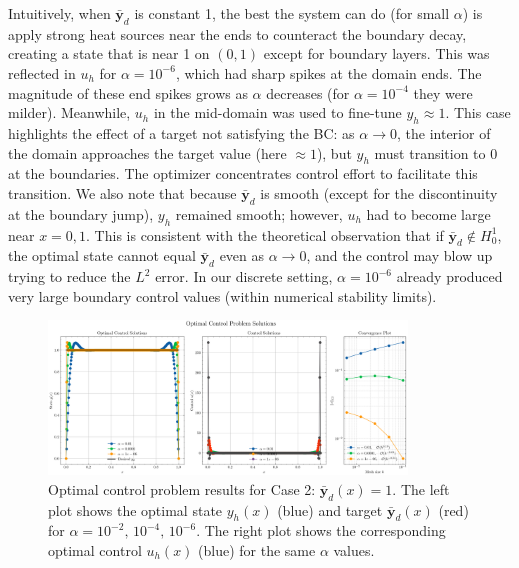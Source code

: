 Intuitively, when $\bar{\mathbf{y}}_d$ is constant 1, the best the system can do (for small $\alpha$) is apply strong heat sources near the ends to counteract the boundary decay, creating a state that is near 1 on $(0,1)$ except for boundary layers.
This was reflected in $u_h$ for $\alpha=10^{-6}$, which had sharp spikes at the domain ends. The magnitude of these end spikes grows as $\alpha$ decreases (for $\alpha=10^{-4}$ they were milder).
Meanwhile, $u_h$ in the mid-domain was used to fine-tune $y_h\approx 1$. This case highlights the effect of a target not satisfying the BC: as $\alpha\to0$, the interior of the domain approaches the target value (here $\approx 1$), but $y_h$ must transition to 0 at the boundaries. The optimizer concentrates control effort to facilitate this transition. We also note that because $\bar{\mathbf{y}}_d$ is smooth (except for the discontinuity at the boundary jump), $y_h$ remained smooth; however, $u_h$ had to become large near $x=0,1$. This is consistent with the theoretical observation that if $\bar{\mathbf{y}}_d\notin H^1_0$, the optimal state cannot equal $\bar{\mathbf{y}}_d$ even as $\alpha\to0$, and the control may blow up trying to reduce the $L^2$ error. In our discrete setting, $\alpha=10^{-6}$ already produced very large boundary control values (within numerical stability limits).
\begin{figure}[H]
	\centering
	\includegraphics[width=0.85\textwidth]{figures/opt_control_plot_Case 2.png}
	\caption{Optimal control problem results for Case 2: $\bar{\mathbf{y}}_d(x)=1$. The left plot shows the optimal state $y_h(x)$ (blue) and target $\bar{\mathbf{y}}_d(x)$ (red) for $\alpha=10^{-2},\,10^{-4},\,10^{-6}$. The right plot shows the corresponding optimal control $u_h(x)$ (blue) for the same $\alpha$ values.}
	\label{fig:opt_control_case2}
\end{figure}

